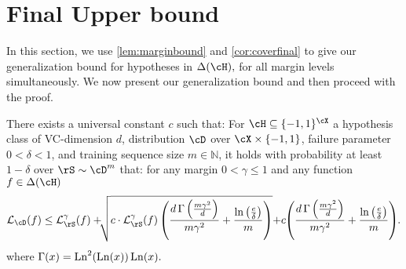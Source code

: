 \section{Final Upper bound}\label{sec:finalbound}

In this section, we use \cref{lem:marginbound} and \cref{cor:coverfinal} to give our generalization bound for hypotheses in $ \dlh,$ for all margin levels simultaneously. We now present our generalization bound and then proceed with the proof. 
\begin{theorem}\label{thm:finalmarginbound}
    There exists a universal constant $ c $  such that: For $ \cH \subseteq \{  -1,1\}^{\cX}$ a hypothesis class of VC-dimension $ d $, distribution $ \cD $ over $ \cX\times \{  -1,1\}  $, failure parameter $0<\delta<1$,  and training sequence size $ m\in \mathbb{N} $, it holds with probability at least $ 1-\delta $ over $ \rS\sim \cD^{m} $ that: for any margin $ 0<\gamma\leq 1 $ and any function $ f\in \dlh $
    \begin{align*}
     \ls_{\cD}(f)\leq 
     \ls_{\rS}^{\gamma}(f)
     +\negmedspace\negmedspace\sqrt{c\cdot \ls_{\rS}^{\gamma}(f) \left(\frac{d\func{\left(\frac{m\gamma^{2} }{d} \right)}}{m\gamma^{2}}
     +\frac{\ln{\left(\frac{e}{\delta} \right)}}{m}\right)} 
     \negmedspace+\negmedspace c \negmedspace\left(\frac{d\func{\left(\frac{m\gamma^{2} }{d} \right)}}{m\gamma^{2}}+\frac{\ln{\left(\frac{e}{\delta} \right)}}{m}\right)\negmedspace.
    \end{align*}
    where $ \operatorname{\Gamma}(x)=\operatorname{\mathrm{Ln}}^{2}(\operatorname{\mathrm{Ln}}(x))\operatorname{\mathrm{Ln}}(x).$      
\end{theorem}

